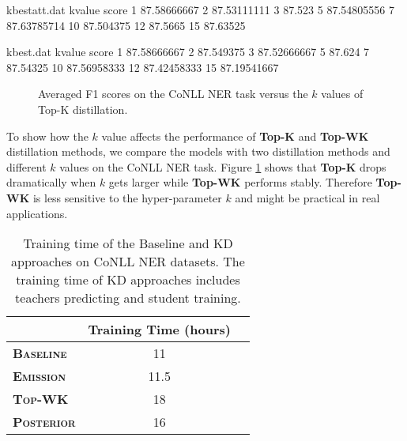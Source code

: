\documentclass[11pt,a4paper]{article}
\begin{document}
\begin{filecontents}{kbestatt.dat}
kvalue score
1 87.58666667
2 87.53111111
3 87.523
5 87.54805556
7 87.63785714
10 87.504375
12 87.5665
15 87.63525
\end{filecontents}

\begin{filecontents}{kbest.dat}
kvalue score
1 87.58666667
2 87.549375
3 87.52666667
5 87.624
7 87.54325
10 87.56958333
12 87.42458333
15 87.19541667
\end{filecontents}

\begin{figure}[t]
\centering
{}
\caption{Averaged F1 scores on the CoNLL NER task versus the $k$ values of Top-K distillation. }
\label{fig:kbest}
\end{figure}

To show how the $k$ value affects the performance of \textbf{Top-K} and \textbf{Top-WK} distillation methods, we compare the models with two distillation methods and different $k$ values on the CoNLL NER task. Figure \ref{fig:kbest} shows that \textbf{Top-K} drops dramatically when $k$ gets larger while \textbf{Top-WK} performs stably. Therefore \textbf{Top-WK} is less sensitive to the hyper-parameter $k$ and might be practical in real applications.



\begin{table}[t]
\centering
\small
\begin{tabular}{l|cc}
\hline\hline
& \textbf{Training Time (hours)}\\
\hline
{\bf\textsc{Baseline}} & 11  \\
{\bf\textsc{Emission}} & 11.5  \\
{\bf\textsc{Top-WK}} & 18  \\
{\bf\textsc{Posterior}} & 16 \\
\hline\hline
\end{tabular}
\caption{Training time of the Baseline and KD approaches on CoNLL NER datasets. The training time of KD approaches includes teachers predicting and student training.}
\label{tab:time-consumption}
\end{table}
\end{document}
